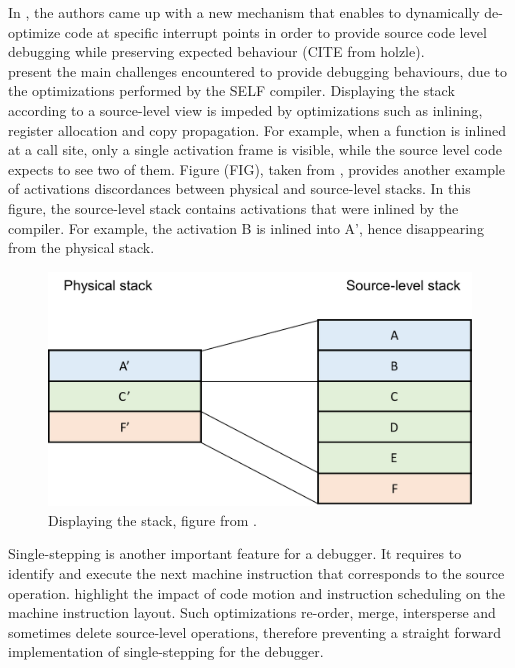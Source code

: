 In \cite{holzle1992debugging}, the authors came up with a new mechanism that enables to dynamically de-optimize code at specific interrupt points in order to provide source code level debugging while preserving expected behaviour (CITE from holzle).\\

 present the main challenges encountered to provide debugging behaviours, due to the optimizations performed by the SELF compiler. 
Displaying the stack according to a source-level view is impeded by optimizations such as inlining, register allocation and copy propagation.
For example, when a function is inlined at a call site, only a single activation frame is visible, while the source level code expects to see two of them.
Figure (FIG), taken from \cite{holzle1992debugging}, provides another example of activations discordances between physical and source-level stacks.
In this figure, the source-level stack contains activations that were inlined by the compiler. For example, the activation B is inlined into A', hence disappearing from the physical stack.\\
\begin{figure}[h]
\centering
\includegraphics[scale=0.5]{Figures/Figure1}
\decoRule
\caption[physical vs. source-level stacks]{Displaying the stack, figure from \cite{holzle1992debugging}.}
\end{figure}

Single-stepping is another important feature for a debugger. 
It requires to identify and execute the next machine instruction that corresponds to the source operation.
 highlight the impact of code motion and instruction scheduling on the machine instruction layout. 
Such optimizations re-order, merge, intersperse and sometimes delete source-level operations, therefore preventing a straight forward implementation of single-stepping for the debugger.\\

